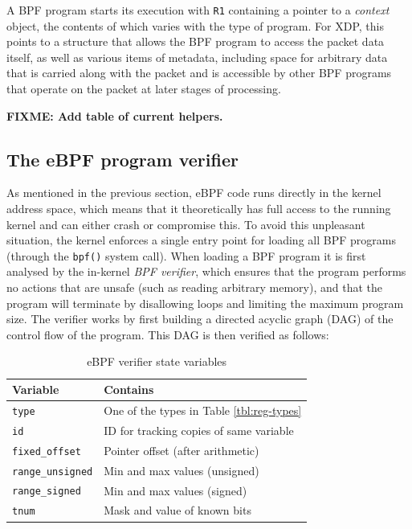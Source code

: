 \documentclass[10pt,sigconf]{acmart}
\begin{document}
A BPF program starts its execution with \texttt{R1} containing a pointer to a \emph{context}
object, the contents of which varies with the type of program. For XDP, this
points to a structure that allows the BPF program to access the packet data
itself, as well as various items of metadata, including space for arbitrary data
that is carried along with the packet and is accessible by other BPF programs
that operate on the packet at later stages of processing.

\textbf{FIXME: Add table of current helpers.}


\subsection{The eBPF program verifier}
\label{sec:bpf-verifier}
As mentioned in the previous section, eBPF code runs directly in the kernel
address space, which means that it theoretically has full access to the running
kernel and can either crash or compromise this. To avoid this unpleasant
situation, the kernel enforces a single entry point for loading all BPF programs
(through the \texttt{bpf()} system call). When loading a BPF program it is first
analysed by the in-kernel \emph{BPF verifier}, which ensures that the program
performs no actions that are unsafe (such as reading arbitrary memory), and that
the program will terminate by disallowing loops and limiting the maximum program
size. The verifier works by first building a directed acyclic graph (DAG) of the
control flow of the program. This DAG is then verified as follows:

\begin{table}[tbp]
\caption{\label{tbl:vrf-state-vars}
eBPF verifier state variables}
\centering
\begin{tabular}{ll}
\toprule
Variable & Contains\\
\midrule
\texttt{type} & One of the types in Table \ref{tbl:reg-types}\\
\texttt{id} & ID for tracking copies of same variable\\
\texttt{fixed\_offset} & Pointer offset (after arithmetic)\\
\texttt{range\_unsigned} & Min and max values (unsigned)\\
\texttt{range\_signed} & Min and max values (signed)\\
\texttt{tnum} & Mask and value of known bits\\
\bottomrule
\end{tabular}
\end{table}
\end{document}
